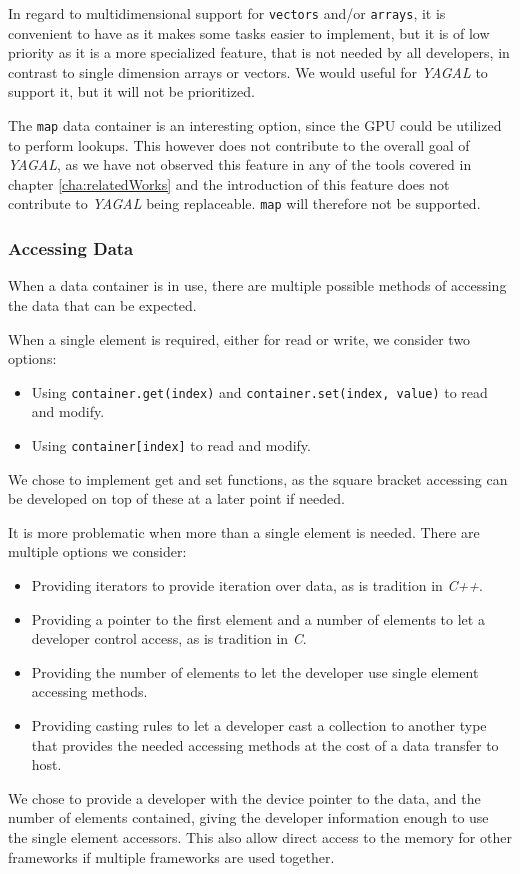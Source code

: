 In regard to multidimensional support for \texttt{vectors} and/or \texttt{arrays}, it is convenient to have as it makes some tasks easier to implement, but it is of low priority as it is a more specialized feature, that is not needed by all developers, in contrast to single dimension arrays or vectors. We would useful for \textit{YAGAL} to support it, but it will not be prioritized.

The \texttt{map} data container is an interesting option, since the GPU could be utilized to perform lookups. This however does not contribute to the overall goal of \textit{YAGAL}, as we have not observed this feature in any of the tools covered in chapter \ref{cha:relatedWorks} and the introduction of this feature does not contribute to \textit{YAGAL} being replaceable. \texttt{map} will therefore not be supported.

\subsubsection{Accessing Data}
When a data container is in use, there are multiple possible methods of accessing the data that can be expected. 

When a single element is required, either for read or write, we consider two options:
\begin{itemize}
\item Using \texttt{container.get(index)} and \texttt{container.set(index, value)} to read and modify.
\item Using \texttt{container[index]} to read and modify.
\end{itemize}
We chose to implement get and set functions, as the square bracket accessing can be developed on top of these at a later point if needed.

It is more problematic when more than a single element is needed. There are multiple options we consider:
\begin{itemize}
\item Providing iterators to provide iteration over data, as is tradition in \textit{C++}.
\item Providing a pointer to the first element and a number of elements to let a developer control access, as is tradition in \textit{C}.
\item Providing the number of elements to let the developer use single element accessing methods.
\item Providing casting rules to let a developer cast a collection to another type that provides the needed accessing methods at the cost of a data transfer to host.
\end{itemize}
We chose to provide a developer with the device pointer to the data, and the number of elements contained, giving the developer information enough to use the single element accessors. This also allow direct access to the memory for other frameworks if multiple frameworks are used together.

